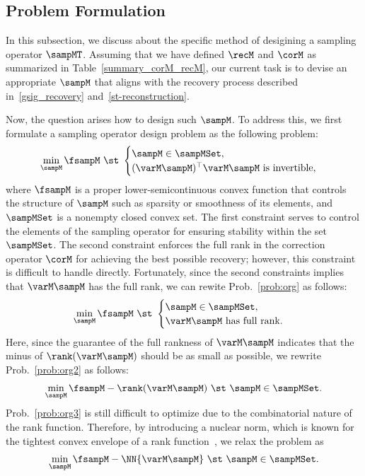 \documentclass[journal]{IEEEtran}
\begin{document}


\subsection{Problem Formulation}
\label{subsec:prob_formulation}
In this subsection, we discuss about the specific method of desigining a sampling operator $\sampMT$.
Assuming that we have defined $\recM$ and $\corM$ as summarized in Table~\ref{summary_corM_recM}, our current task is to devise an appropriate $\sampM$ that aligns with the recovery process described in~\eqref{gsig_recovery} and~\eqref{st-reconstruction}.

Now, the question arises how to design such $\sampM$. 
To address this, we first formulate a sampling operator design problem as the following problem:
\begin{align}\label{prob:org}
    \min_{\sampM}\fsampM \ \st \
    \begin{cases}
    \sampM \in \sampMSet, \\
    (\varM \sampM)^{\top} \varM \sampM \mbox{ is invertible},
    \end{cases}
\end{align}
where $\fsampM$ is a proper lower-semicontinuous convex function that controls the structure of $\sampM$ such as sparsity or smoothness of its elements, and $\sampMSet$ is a nonempty closed convex set.
The first constraint serves to control the elements of the sampling operator for ensuring stability within the set $\sampMSet$.
The second constraint enforces the full rank in the correction operator $\corM$ for achieving the best possible recovery; however, this constraint is difficult to handle directly.
Fortunately, since the second constraints implies that $\varM \sampM$ has the full rank, we can rewite Prob.~\eqref{prob:org} as follows:
\begin{align}\label{prob:org2}
    \min_{\sampM}\fsampM \ \st \
    \begin{cases}
    \sampM \in \sampMSet, \\
    \varM \sampM \mbox{ has full rank}.
    \end{cases}
\end{align}
Here, since the guarantee of the full rankness of $\varM \sampM$ indicates that the minus of $\rank(\varM \sampM)$ should be as small as possible, we rewrite Prob.~\eqref{prob:org2} as follows:
\begin{align}\label{prob:org3}
    \min_{\sampM} \fsampM - \rank({\varM \sampM}) \ \st \ \sampM\in \sampMSet.
\end{align}
Prob.~\eqref{prob:org3} is still difficult to optimize due to the combinatorial nature of the rank function.
Therefore, by introducing a nuclear norm, which is known for the tightest convex envelope of a rank function~\cite{fazel2002matrix}, we relax the problem as 
\begin{align}\label{prob:org4}
    \min_{\sampM} \fsampM - \NN{\varM \sampM} \ \st \ \sampM\in \sampMSet.
\end{align}
\end{document}

